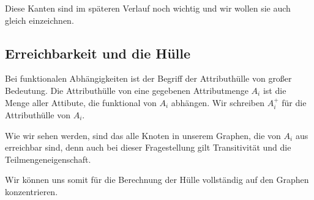 \documentclass[a4paper, ngerman]{article}
\begin{document}
Diese Kanten sind im späteren Verlauf
noch wichtig und wir wollen sie auch gleich einzeichnen.
\begin{center}
\end{center}

\subsection*{Erreichbarkeit und die Hülle}
Bei funktionalen Abhängigkeiten ist
der Begriff der Attributhülle 
von großer Bedeutung.
Die Attributhülle von eine
gegebenen Attributmenge $A_i$
ist die Menge aller Attibute, 
die funktional von $A_i$ abhängen.
Wir schreiben $A_i^+$ für die Attributhülle von $A_i$.

Wie wir sehen werden,
sind das alle Knoten in unserem Graphen,
die von $A_i$ aus erreichbar sind,
denn auch bei dieser Fragestellung
gilt Transitivität und die Teilmengeneigenschaft.

Wir können uns somit für die Berechnung der Hülle
vollständig auf den Graphen konzentrieren.
\end{document}
